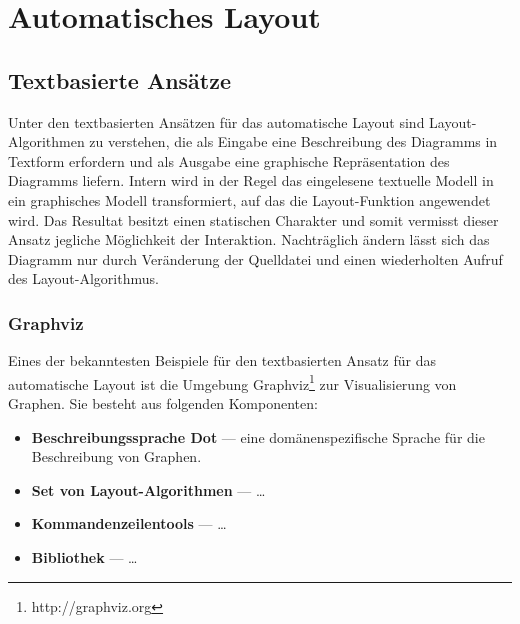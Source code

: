 
\section{Automatisches Layout}
\label{sec:automatic-layout}

 
\subsection{Textbasierte Ansätze}

Unter den textbasierten Ansätzen für das automatische Layout sind Layout-Algorithmen zu verstehen, die als Eingabe eine Beschreibung des Diagramms in Textform erfordern und als Ausgabe eine graphische Repräsentation des Diagramms liefern. Intern wird in der Regel das eingelesene textuelle Modell in ein graphisches Modell transformiert, auf das die Layout-Funktion angewendet wird. Das Resultat besitzt einen statischen Charakter und somit vermisst dieser Ansatz jegliche Möglichkeit der Interaktion. Nachträglich ändern lässt sich das Diagramm nur durch Veränderung der Quelldatei und einen wiederholten Aufruf des Layout-Algorithmus.

\subsubsection{Graphviz}


Eines der bekanntesten Beispiele für den textbasierten Ansatz für das automatische Layout ist die Umgebung Graphviz\footnote{http://graphviz.org} zur Visualisierung von Graphen. Sie besteht aus folgenden Komponenten:

\begin{itemize}
    \item \textbf{Beschreibungssprache Dot} — eine domänenspezifische Sprache für die Beschreibung von Graphen. %
    \item \textbf{Set von Layout-Algorithmen} — \dots
    \item \textbf{Kommandenzeilentools} — \dots
    \item \textbf{Bibliothek} — \dots
\end{itemize}


